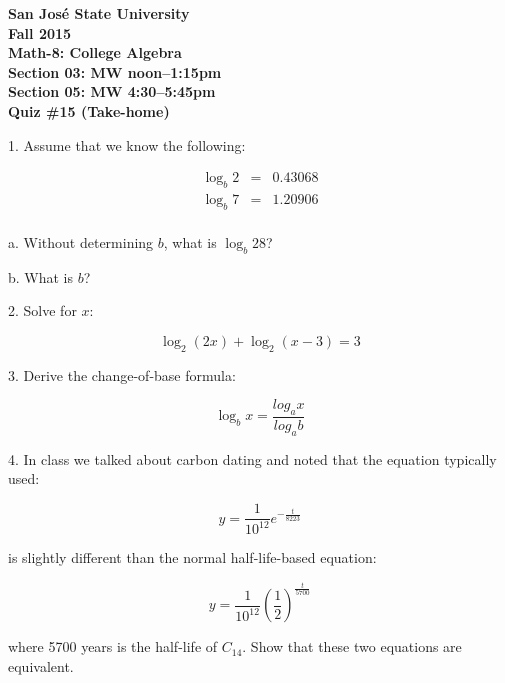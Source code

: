 \documentclass[letterpaper, 12pt]{article}
\begin{document}
\begin{center}
\bfseries
San Jos\'{e} State University \\
Fall 2015 \\
Math-8: College Algebra \\
Section 03: MW noon--1:15pm \\
Section 05: MW 4:30--5:45pm \\
\bigskip
Quiz \#15 (Take-home)
\end{center}

\bigskip

1. Assume that we know the following:

\begin{eqnarray*}
\log_{b}2 &=& 0.43068 \\
\log_{b}7 &=& 1.20906 \\
\end{eqnarray*}

a. Without determining $b$, what is $\log_{b}28$?

\bigskip

b. What is $b$?

\bigskip

2. Solve for $x$:

\[\log_2(2x)+\log_2(x-3)=3\]

3. Derive the change-of-base formula:

\[\log_{b}x=\frac{log_a x}{log_a b}\]

4. In class we talked about carbon dating and noted that the equation typically
used:

\[y=\frac{1}{10^{12}}e^{-\frac{t}{8223}}\]

is slightly different than the normal half-life-based equation:

\[y=\frac{1}{10^{12}}\left(\frac{1}{2}\right)^{\frac{t}{5700}}\]

where 5700 years is the half-life of $C_{14}$. Show that these two equations are
equivalent.
\end{document}
